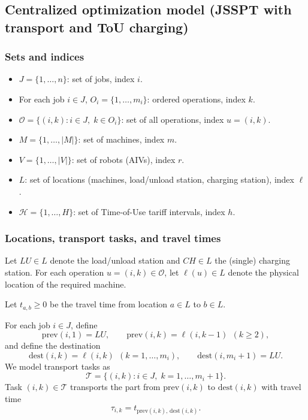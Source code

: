 \documentclass[preprint, 3p, review, 12pt]{elsarticle}
\begin{document}

\subsection{Centralized optimization model (JSSPT with transport and ToU charging)}

\subsubsection{Sets and indices}
\begin{itemize}
  \item $J=\{1,\dots,n\}$: set of jobs, index $i$.
  \item For each job $i\in J$, $O_i=\{1,\dots,m_i\}$: ordered operations, index $k$.
  \item $\mathcal{O}=\{(i,k): i\in J,\; k\in O_i\}$: set of all operations, index $u=(i,k)$.
  \item $M=\{1,\dots,|M|\}$: set of machines, index $m$.
  \item $V=\{1,\dots,|V|\}$: set of robots (AIVs), index $r$.
  \item $L$: set of locations (machines, load/unload station, charging station), index $\ell$.
  \item $\mathcal{H}=\{1,\dots,H\}$: set of Time-of-Use tariff intervals, index $h$.
\end{itemize}

\subsubsection{Locations, transport tasks, and travel times}
Let $LU\in L$ denote the load/unload station and $CH\in L$ the (single) charging station.
For each operation $u=(i,k)\in\mathcal{O}$, let $\ell(u)\in L$ denote the physical location of the required machine.

Let $t_{a,b}\ge 0$ be the travel time from location $a\in L$ to $b\in L$.

For each job $i\in J$, define
\[
\mathrm{prev}(i,1)=LU,\qquad \mathrm{prev}(i,k)=\ell(i,k-1)\ \ (k\ge 2),
\]
and define the destination
\[
\mathrm{dest}(i,k)=\ell(i,k)\ \ (k=1,\dots,m_i),\qquad \mathrm{dest}(i,m_i+1)=LU.
\]
We model transport tasks as
\[
\mathcal{T}=\{(i,k): i\in J,\; k=1,\dots,m_i+1\}.
\]
Task $(i,k)\in\mathcal{T}$ transports the part from $\mathrm{prev}(i,k)$ to $\mathrm{dest}(i,k)$ with travel time
\[
\tau_{i,k}=t_{\mathrm{prev}(i,k),\,\mathrm{dest}(i,k)}.
\]
\end{document}
